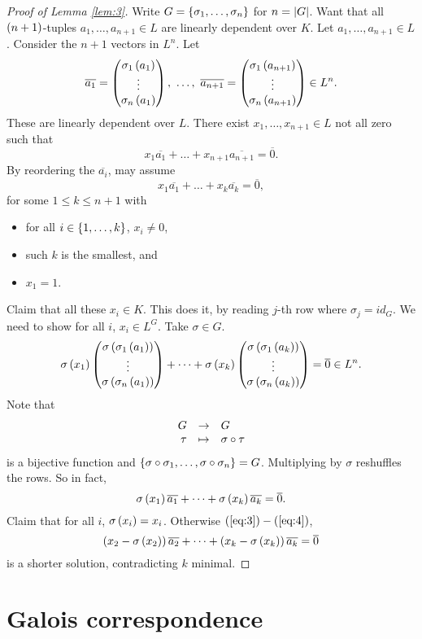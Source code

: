 \begin{proof}[Proof of Lemma \ref{lem:3}]
Write $ G = \left\{ \sigma_1, \dots, \sigma_n \right\} $ for $ n = \left\lvert G \right\rvert $. Want that all $ \left( n + 1 \right) $-tuples $ a_1, \dots, a_{n + 1} \in L $ are linearly dependent over $ K $. Let $ a_1, \dots, a_{n + 1} \in L $. Consider the $ n + 1 $ vectors in $ L^n $. Let
$$ \overline{a_1} = \threebyone{\sigma_1\rb{a_1}}{\vdots}{\sigma_n\rb{a_1}}, \ \dots, \ \overline{a_{n + 1}} = \threebyone{\sigma_1\rb{a_{n + 1}}}{\vdots}{\sigma_n\rb{a_{n + 1}}} \in L^n. $$
These are linearly dependent over $ L $. There exist $ x_1, \dots, x_{n + 1} \in L $ not all zero such that
$$ x_1\overline{a_1} + \dots + x_{n + 1}\overline{a_{n + 1}} = \overline{0}. $$
By reordering the $ \overline{a_i} $, may assume
\begin{equation}
\label{eq:3}
x_1\overline{a_1} + \dots + x_k\overline{a_k} = \overline{0},
\end{equation}
for some $ 1 \le k \le n + 1 $ with
\begin{itemize}
\item for all $ i \in \left\{ 1, \dots, k \right\} $, $ x_i \ne 0 $,
\item such $ k $ is the smallest, and
\item $ x_1 = 1 $.
\end{itemize}
Claim that all these $ x_i \in K $. This does it, by reading $ j $-th row where $ \sigma_j = id_G $. We need to show for all $ i $, $ x_i \in L^G $. Take $ \sigma \in G $.
$$ \sigma\left( x_1 \right)\begin{pmatrix} \sigma\left( \sigma_1\left( a_1 \right) \right) \\ \vdots \\ \sigma\left( \sigma_n\left( a_1 \right) \right) \end{pmatrix} + \dots + \sigma\left( x_k \right)\begin{pmatrix} \sigma\left( \sigma_1\left( a_k \right) \right) \\ \vdots \\ \sigma\left( \sigma_n\left( a_k \right) \right) \end{pmatrix} = \overline{0} \in L^n. $$
Note that
$$ \function{G}{G}{\tau}{\sigma \circ \tau} $$
is a bijective function and $ \left\{ \sigma \circ \sigma_1, \dots, \sigma \circ \sigma_n \right\} = G $. Multiplying by $ \sigma $ reshuffles the rows. So in fact,
\begin{equation}
\label{eq:4}
\sigma\left( x_1 \right)\overline{a_1} + \dots + \sigma\left( x_k \right)\overline{a_k} = \overline{0}.
\end{equation}
Claim that for all $ i $, $ \sigma\left( x_i \right) = x_i $. Otherwise $ \left( \ref{eq:3} \right) - \left( \ref{eq:4} \right) $,
$$ \left( x_2 - \sigma\left( x_2 \right) \right)\overline{a_2} + \dots + \left( x_k - \sigma\left( x_k \right) \right)\overline{a_k} = \overline{0} $$
is a shorter solution, contradicting $ k $ minimal.
\end{proof}

\pagebreak

\section{Galois correspondence}

